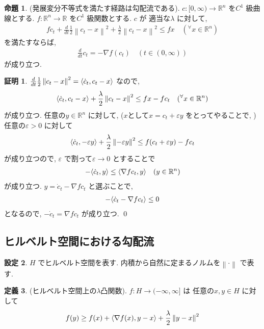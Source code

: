 \documentclass[10pt, fleqn, label-section=none]{bxjsarticle}
\theoremstyle{definition}
\newtheorem{dfn}{定義}[section]
\newtheorem{prop}[dfn]{命題}
\newtheorem{setting}[dfn]{設定}
\newtheorem*{pf*}{証明}
\newcommand{\any}{{}^{\forall}}
\newcommand{\veps}{\varepsilon}
\newcommand{\tbra}[1]{\mleft\langle#1\mright\rangle}
\newcommand{\norm}[1]{\left\|#1\right\|}
\renewcommand{\;}{\, ; \,}
\begin{document}
\begin{prop}(発展変分不等式を満たす経路は勾配流である).  
$c: [0, \infty) \rightarrow \mathbb R^n$ を$C^1$ 級曲線とする. $f: \mathbb R^n \rightarrow \mathbb R$ を$C^1$ 級関数とする. $c$ が
適当な$\lambda $ に対して,
\begin{align*} f c_t + \frac{d}{dt}\frac{1}{2} \norm{c_t - x}^2 + \frac{\lambda}{2} \norm{c_t - x}^2 \leq fx  \quad (\any x \in \mathbb R^n) \end{align*}
を満たすならば, 
\begin{align*} \frac{d}{dt} c_t = - \nabla f (c_t) \quad (t \in (0,\infty)) \end{align*}
が成り立つ. 
\end{prop}
\begin{pf*}
$\frac{d}{dt}\frac{1}{2} \norm{c_t - x}^2 = \tbra{\dot c_t , c_t - x}$ なので, 
\begin{align*}\tbra{\dot c_t , c_t - x} + \frac{\lambda}{2} \norm{c_t - x}^2 \leq fx - f c_t \quad (\any x \in \mathbb R^n) \end{align*}
が成り立つ. 任意の$y \in \mathbb R^n$ に対して, ($x$として$x = c_t + \veps y$ をとってやることで, )任意の$\veps > 0$ に対して
\begin{align*}\tbra{\dot c_t , - \veps y} + \frac{\lambda}{2} \norm{ - \veps y}^2 \leq f(c_t + \veps y) - f c_t \end{align*}
が成り立つので, $\veps$ で割って$\veps \rightarrow 0$ とすることで
\begin{align*} - \tbra{\dot c_t, y} \leq \tbra{\nabla f c_t, y} \quad (y \in \mathbb R^n) \end{align*}
が成り立つ. $y = \dot c_t - \nabla f c_t $ と選ぶことで, 
\begin{align*} - \tbra{\dot c_t - \nabla f c_t   }  \leq 0\end{align*}
となるので, $- \dot c_t = \nabla f c_t$ が成り立つ. 
\qed
\end{pf*}





\subsection{ヒルベルト空間における勾配流}

\begin{setting}
$H$ でヒルベルト空間を表す. 内積から自然に定まるノルムを$\norm \cdot$ で表す. 
\end{setting}

\begin{dfn}(ヒルベルト空間上の$\lambda$凸関数). $f: H \rightarrow (-\infty, \infty]$ は
任意の$x, y \in H$ に対して
\begin{align*} f(y) \geq f(x) + \tbra{\nabla f (x), y- x } + \frac{\lambda}{2} \norm{y - x}^2 \end{align*}
\end{dfn}
\end{document}
